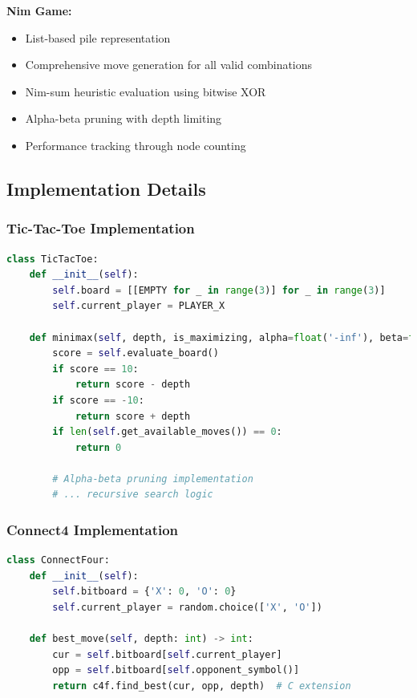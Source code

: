 \documentclass[12pt]{article}
\begin{document}
\textbf{Nim Game:}
\begin{itemize}
    \item List-based pile representation
    \item Comprehensive move generation for all valid combinations
    \item Nim-sum heuristic evaluation using bitwise XOR
    \item Alpha-beta pruning with depth limiting
    \item Performance tracking through node counting
\end{itemize}

\subsection{Implementation Details}

\subsubsection{Tic-Tac-Toe Implementation}

\begin{lstlisting}[language=Python, basicstyle=\small]
class TicTacToe:
    def __init__(self):
        self.board = [[EMPTY for _ in range(3)] for _ in range(3)]
        self.current_player = PLAYER_X
    
    def minimax(self, depth, is_maximizing, alpha=float('-inf'), beta=float('inf')):
        score = self.evaluate_board()
        if score == 10:
            return score - depth
        if score == -10:
            return score + depth
        if len(self.get_available_moves()) == 0:
            return 0
        
        # Alpha-beta pruning implementation
        # ... recursive search logic
\end{lstlisting}

\subsubsection{Connect4 Implementation}

\begin{lstlisting}[language=Python, basicstyle=\small]
class ConnectFour:
    def __init__(self):
        self.bitboard = {'X': 0, 'O': 0}
        self.current_player = random.choice(['X', 'O'])
    
    def best_move(self, depth: int) -> int:
        cur = self.bitboard[self.current_player]
        opp = self.bitboard[self.opponent_symbol()]
        return c4f.find_best(cur, opp, depth)  # C extension
\end{lstlisting}
\end{document}
